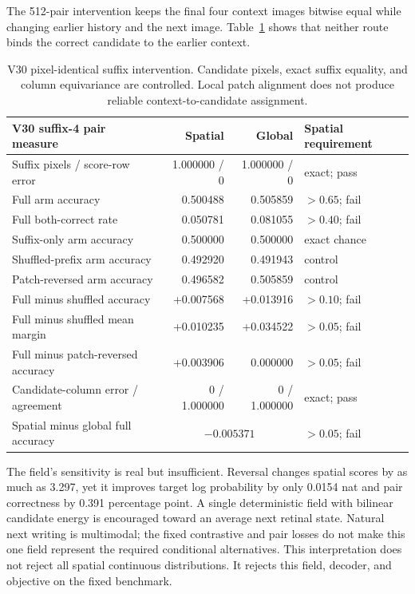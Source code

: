 \documentclass[11pt]{article}
\begin{document}
The 512-pair intervention keeps the final four context images bitwise equal
while changing earlier history and the next image. Table~\ref{tab:v30pairs}
shows that neither route binds the correct candidate to the earlier context.

\begin{table}[h!]
\centering
\small
\begin{tabular}{lrrl}
\toprule
V30 suffix-4 pair measure & Spatial & Global & Spatial requirement \\
\midrule
Suffix pixels / score-row error & 1.000000 / 0 & 1.000000 / 0 & exact; pass \\
Full arm accuracy & 0.500488 & 0.505859 & $>0.65$; fail \\
Full both-correct rate & 0.050781 & 0.081055 & $>0.40$; fail \\
Suffix-only arm accuracy & 0.500000 & 0.500000 & exact chance \\
Shuffled-prefix arm accuracy & 0.492920 & 0.491943 & control \\
Patch-reversed arm accuracy & 0.496582 & 0.505859 & control \\
Full minus shuffled accuracy & +0.007568 & +0.013916 & $>0.10$; fail \\
Full minus shuffled mean margin & +0.010235 & +0.034522 & $>0.05$; fail \\
Full minus patch-reversed accuracy & +0.003906 & 0.000000 & $>0.05$; fail \\
Candidate-column error / agreement & 0 / 1.000000 & 0 / 1.000000 & exact; pass \\
Spatial minus global full accuracy & \multicolumn{2}{c}{$-0.005371$} & $>0.05$; fail \\
\bottomrule
\end{tabular}
\caption{V30 pixel-identical suffix intervention. Candidate pixels, exact
suffix equality, and column equivariance are controlled. Local patch alignment
does not produce reliable context-to-candidate assignment.}
\label{tab:v30pairs}
\end{table}

The field's sensitivity is real but insufficient. Reversal changes spatial
scores by as much as 3.297, yet it improves target log probability by only
0.0154 nat and pair correctness by 0.391 percentage point. A single
deterministic field with bilinear candidate energy is encouraged toward an
average next retinal state. Natural next writing is multimodal; the fixed
contrastive and pair losses do not make this one field represent the required
conditional alternatives. This interpretation does not reject all spatial
continuous distributions. It rejects this field, decoder, and objective on the
fixed benchmark.
\end{document}
